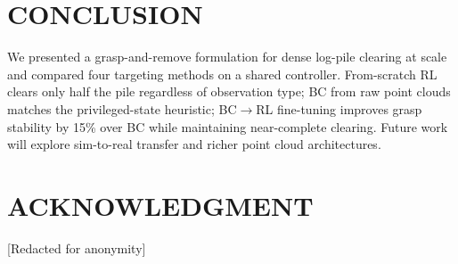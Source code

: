 \documentclass[letterpaper, 10 pt, conference]{ieeeconf}
\begin{document}
\section{CONCLUSION}
We presented a grasp-and-remove formulation for dense log-pile clearing at scale and compared four targeting methods on a shared controller.
From-scratch RL clears only half the pile regardless of observation type; BC from raw point clouds matches the privileged-state heuristic; BC$\to$RL fine-tuning improves grasp stability by 15\% over BC while maintaining near-complete clearing.
Future work will explore sim-to-real transfer and richer point cloud architectures.

\addtolength{\textheight}{-12cm}  %

\section*{ACKNOWLEDGMENT}
[Redacted for anonymity]



\end{document}

